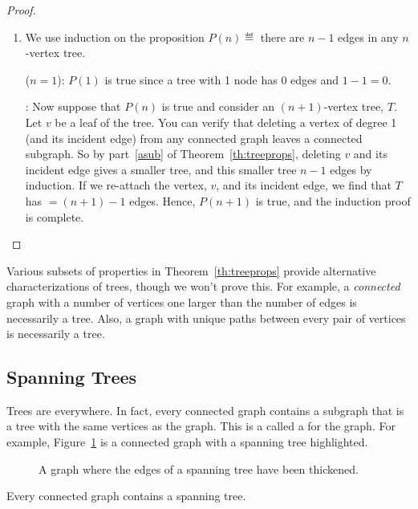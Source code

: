 \begin{proof}
\begin{enumerate}
\item We use induction on the proposition $P(n) \eqdef {}$ there are
  $n - 1$ edges in any $n$-vertex tree.

 ($n = 1$): $P(1)$ is true since a tree with
1 node has 0 edges and $1 - 1 = 0$.

: Now suppose that $P(n)$ is true and
consider an $(n+1)$-vertex tree, $T$.  Let $v$ be a leaf of the tree.
You can verify that deleting a vertex of degree 1 (and its incident
edge) from any connected graph leaves a connected subgraph.  So by
part~\ref{asub} of Theorem~\ref{th:treeprops}, deleting $v$ and its
incident edge gives a smaller tree, and this smaller tree $n - 1$
edges by induction.  If we re-attach the vertex, $v$, and its incident
edge, we find that $T$ has $ = (n + 1) - 1$ edges.  Hence, $P(n + 1)$
is true, and the induction proof is complete.  \qedhere

\end{enumerate}

\end{proof}

Various subsets of properties in Theorem~\ref{th:treeprops} provide
alternative characterizations of trees, though we won't prove this.
For example, a \emph{connected} graph with a number of vertices one
larger than the number of edges is necessarily a tree.  Also, a graph
with unique paths between every pair of vertices is necessarily a
tree.

\subsection{Spanning Trees}

Trees are everywhere.  In fact, every connected graph contains a
subgraph that is a tree with the same vertices as the graph.  This is
a called a  for the graph.  For example,
Figure~\ref{fig:5LL} is a connected graph with a spanning tree
highlighted.

\begin{figure}


\caption{A graph where the edges of a spanning tree have been
  thickened.}

\label{fig:5LL}

\end{figure}

\begin{theorem}
Every connected graph contains a spanning tree.
\end{theorem}

